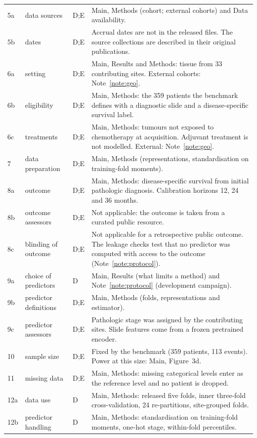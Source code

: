 \documentclass[11pt]{article}
\begin{document}
{\begin{longtable}{p{}p{}p{}p{}}
5a & data sources & D;E & Main, Methods (cohort; external cohorts) and Data availability. \\
5b & dates & D;E & Accrual dates are not in the released files. The source collections are described in their original publications. \\
6a & setting & D;E & Main, Results and Methods: tissue from 33 contributing sites. External cohorts: Note~\ref{note:geo}. \\
6b & eligibility & D;E & Main, Methods: the 359 patients the benchmark defines with a diagnostic slide and a disease-specific survival label. \\
6c & treatments & D;E & Main, Methods: tumours not exposed to chemotherapy at acquisition. Adjuvant treatment is not modelled. External: Note~\ref{note:geo}. \\
7 & data preparation & D;E & Main, Methods (representations, standardisation on training-fold moments). \\
8a & outcome & D;E & Main, Methods: disease-specific survival from initial pathologic diagnosis. Calibration horizons 12, 24 and 36 months. \\
8b & outcome assessors & D;E & Not applicable: the outcome is taken from a curated public resource. \\
8c & blinding of outcome & D;E & Not applicable for a retrospective public outcome. The leakage checks test that no predictor was computed with access to the outcome (Note~\ref{note:protocol}). \\
9a & choice of predictors & D & Main, Results (what limits a method) and Note~\ref{note:protocol} (development campaign). \\
9b & predictor definitions & D;E & Main, Methods (folds, representations and estimator). \\
9c & predictor assessors & D;E & Pathologic stage was assigned by the contributing sites. Slide features come from a frozen pretrained encoder. \\
10 & sample size & D;E & Fixed by the benchmark (359 patients, 113 events). Power at this size: Main, Figure~3d. \\
11 & missing data & D;E & Main, Methods: missing categorical levels enter as the reference level and no patient is dropped. \\
12a & data use & D & Main, Methods: released five folds, inner three-fold cross-validation, 24 re-partitions, site-grouped folds. \\
12b & predictor handling & D & Main, Methods: standardisation on training-fold moments, one-hot stage, within-fold percentiles. \\

\end{longtable}}
\end{document}
